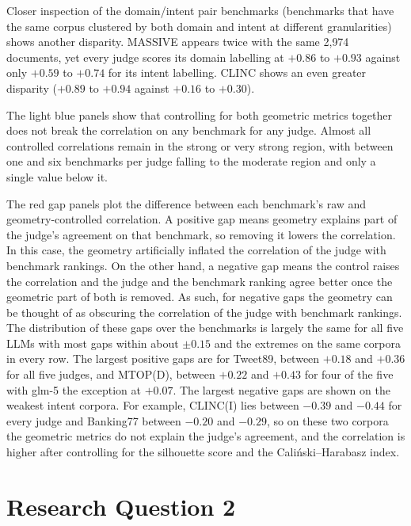 \documentclass[11pt,a4paper,oneside]{report}
\begin{document}
Closer inspection of the domain/intent pair benchmarks (benchmarks that have the same corpus clustered by both domain and intent at different granularities) shows another disparity. MASSIVE appears twice with the same 2{,}974 documents, yet every judge scores its domain labelling at $+0.86$ to $+0.93$ against only $+0.59$ to $+0.74$ for its intent labelling. CLINC shows an even greater disparity ($+0.89$ to $+0.94$ against $+0.16$ to $+0.30$).

The light blue panels show that controlling for both geometric metrics together does not break the correlation on any benchmark for any judge. Almost all controlled correlations remain in the strong or very strong region, with between one and six benchmarks per judge falling to the moderate region and only a single value below it.

The red gap panels plot the difference between each benchmark's raw and geometry-controlled correlation. A positive gap means geometry explains part of the judge's agreement on that benchmark, so removing it lowers the correlation. In this case, the geometry artificially inflated the correlation of the judge with benchmark rankings. On the other hand, a negative gap means the control raises the correlation and the judge and the benchmark ranking agree better once the geometric part of both is removed. As such, for negative gaps the geometry can be thought of as obscuring the correlation of the judge with benchmark rankings. The distribution of these gaps over the benchmarks is largely the same for all five LLMs with most gaps within about $\pm 0.15$ and the extremes on the same corpora in every row. The largest positive gaps are for Tweet89, between $+0.18$ and $+0.36$ for all five judges, and MTOP(D), between $+0.22$ and $+0.43$ for four of the five with {\small\ttfamily glm-5} the exception at $+0.07$. The largest negative gaps are shown on the weakest intent corpora. For example, CLINC(I) lies between $-0.39$ and $-0.44$ for every judge and Banking77 between $-0.20$ and $-0.29$, so on these two corpora the geometric metrics do not explain the judge's agreement, and the correlation is higher after controlling for the silhouette score and the Cali\'nski--Harabasz index.

\section{Research Question 2}
\end{document}
